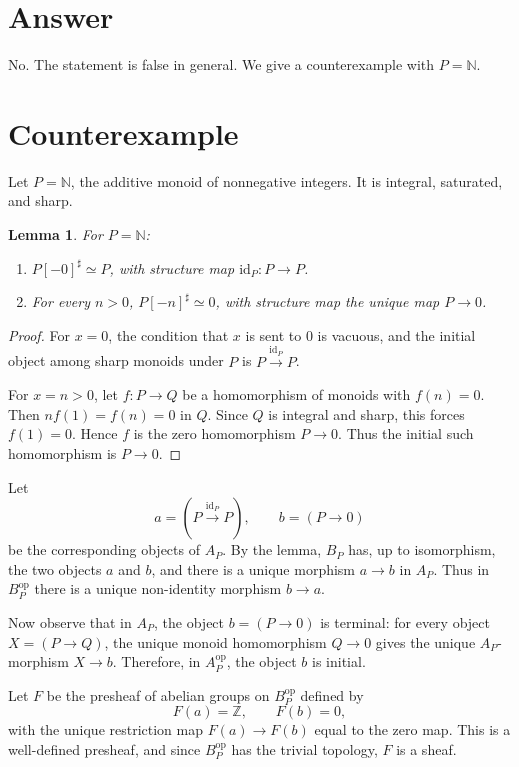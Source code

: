 \documentclass[11pt]{article}
\newtheorem{lemma}{Lemma}
\begin{document}
\section{Answer}

No. The statement is false in general. We give a counterexample with \(P=\mathbb N\).

\section{Counterexample}

Let \(P=\mathbb N\), the additive monoid of nonnegative integers. It is integral, saturated, and sharp.

\begin{lemma}
For \(P=\mathbb N\):
\begin{enumerate}
\item \(P[-0]^\sharp\simeq P\), with structure map \(\mathrm{id}_P\colon P\to P\).
\item For every \(n>0\), \(P[-n]^\sharp\simeq 0\), with structure map the unique map \(P\to 0\).
\end{enumerate}
\end{lemma}

\begin{proof}
For \(x=0\), the condition that \(x\) is sent to \(0\) is vacuous, and the initial object among sharp monoids under \(P\) is \(P\xrightarrow{\mathrm{id}_P}P\).

For \(x=n>0\), let \(f\colon P\to Q\) be a homomorphism of monoids with \(f(n)=0\). Then \(n f(1)=f(n)=0\) in \(Q\). Since \(Q\) is integral and sharp, this forces \(f(1)=0\). Hence \(f\) is the zero homomorphism \(P\to 0\). Thus the initial such homomorphism is \(P\to 0\).
\end{proof}

Let
\[
a=(P\xrightarrow{\mathrm{id}_P}P),\qquad b=(P\to 0)
\]
be the corresponding objects of \(A_P\). By the lemma, \(B_P\) has, up to isomorphism, the two objects \(a\) and \(b\), and there is a unique morphism \(a\to b\) in \(A_P\). Thus in \(B_P^{\mathrm{op}}\) there is a unique non-identity morphism \(b\to a\).

Now observe that in \(A_P\), the object \(b=(P\to 0)\) is terminal: for every object \(X=(P\to Q)\), the unique monoid homomorphism \(Q\to 0\) gives the unique \(A_P\)-morphism \(X\to b\). Therefore, in \(A_P^{\mathrm{op}}\), the object \(b\) is initial.

Let \(F\) be the presheaf of abelian groups on \(B_P^{\mathrm{op}}\) defined by
\[
F(a)=\mathbb Z,\qquad F(b)=0,
\]
with the unique restriction map \(F(a)\to F(b)\) equal to the zero map. This is a well-defined presheaf, and since \(B_P^{\mathrm{op}}\) has the trivial topology, \(F\) is a sheaf.
\end{document}
